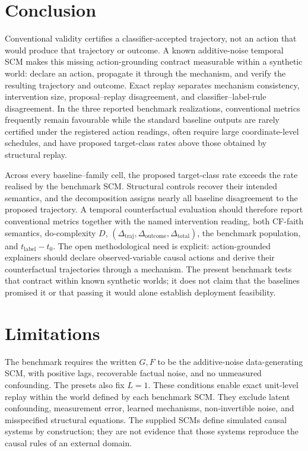 \documentclass{article}
\newcommand{\dototal}{\Delta_{\mathrm{total}}}
\newcommand{\dotraj}{\Delta_{\mathrm{traj}}}
\newcommand{\dooutcome}{\Delta_{\mathrm{outcome}}}
\begin{document}
\section{Conclusion}
\label{sec:conclusion}

Conventional validity certifies a classifier-accepted trajectory, not an action that would produce that trajectory or outcome. A known additive-noise temporal SCM makes this missing action-grounding contract measurable within a synthetic world: declare an action, propagate it through the mechanism, and verify the resulting trajectory and outcome. Exact replay separates mechanism consistency, intervention size, proposal--replay disagreement, and classifier--label-rule disagreement. In the three reported benchmark realizations, conventional metrics frequently remain favourable while the standard baseline outputs are rarely certified under the registered action readings, often require large coordinate-level schedules, and have proposed target-class rates above those obtained by structural replay.

Across every baseline--family cell, the proposed target-class rate exceeds the rate realised by the benchmark SCM. Structural controls recover their intended semantics, and the decomposition assigns nearly all baseline disagreement to the proposed trajectory. A temporal counterfactual evaluation should therefore report conventional metrics together with the named intervention reading, both CF-faith semantics, do-complexity $D$, $(\dotraj,\dooutcome,\dototal)$, the benchmark population, and $t_{\mathrm{label}}-t_0$. The open methodological need is explicit: action-grounded explainers should declare observed-variable causal actions and derive their counterfactual trajectories through a mechanism. The present benchmark tests that contract within known synthetic worlds; it does not claim that the baselines promised it or that passing it would alone establish deployment feasibility.

\clearpage



\appendix

\section{Limitations}
\label{sec:limitations}

The benchmark requires the written $G,F$ to be the additive-noise data-generating SCM, with positive lags, recoverable factual noise, and no unmeasured confounding. The presets also fix $L=1$. These conditions enable exact unit-level replay within the world defined by each benchmark SCM. They exclude latent confounding, measurement error, learned mechanisms, non-invertible noise, and misspecified structural equations. The supplied SCMs define simulated causal systems by construction; they are not evidence that those systems reproduce the causal rules of an external domain.
\end{document}
